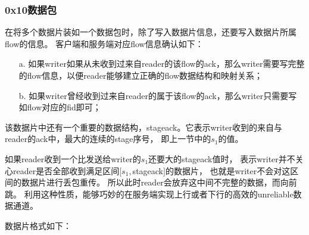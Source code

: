 \subsubsection{0x10数据包}
在将多个数据片装如一个数据包时，除了写入数据片信息，还要写入数据片所属flow的信息。
客户端和服务端对应flow信息确认如下：
\begin{itemize}
    \item [a.] 如果writer如果从未收到过来自reader的该flow的ack，那么writer需要写完整的flow信息，以便reader能够建立正确的flow数据结构和映射关系；
    \item [b.] 如果writer曾经收到过来自reader的属于该flow的ack，那么writer只需要写如flow对应的fid即可；
\end{itemize}

该数据片中还有一个重要的数据结构，stageack。它表示writer收到的来自与reader的ack中，最大的连续的stage序号，
即上一节中的$s_1$的值。

如果reader收到一个比发送给writer的$s_1$还要大的stageack值时，
表示writer并不关心reader是否全部收到满足区间$[s_1,$stageack$]$的数据片，
也就是writer不会对这区间的数据片进行丢包重传。
所以此时reader会放弃这中间不完整的数据，而向前跳。
利用这种性质，能够巧妙的在服务端实现上行或者下行的高效的unreliable数据通道。

数据片格式如下：

